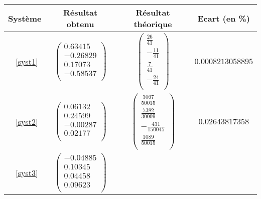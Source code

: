 \documentclass{report}
\begin{document}
        \begin{tabular}{|c|c|c|c|}
          \hline
          Système & Résultat obtenu & Résultat théorique & Ecart (en \%) \\ %
          \hline
          ~\eqref{syst1}
          &
          $\begin{pmatrix}
              0.63415 \\
              -0.26829 \\
              0.17073 \\
              -0.58537 \\
           \end{pmatrix}$
          &
          $\begin{pmatrix}
              \frac{26}{41} \\
              -\frac{11}{41} \\
              \frac{7}{41} \\
              -\frac{24}{41} \\
          \end{pmatrix}$
          &
          $0.0008213058895$\\
          \hline
          ~\eqref{syst2}
          &
          $\begin{pmatrix}
              0.06132 \\
              0.24599 \\
              -0.00287 \\
              0.02177 \\
           \end{pmatrix}$
          &
          $\begin{pmatrix}
              \frac{3067}{50015} \\
              \frac{7382}{30009} \\
              -\frac{431}{150045} \\
              \frac{1089}{50015} \\
          \end{pmatrix}$
          &
          $0.02643817358$ \\
          \hline
          ~\eqref{syst3}
          &
          $\begin{pmatrix}
              -0.04885 \\
              0.10345 \\
              0.04458 \\
              0.09623 \\
           \end{pmatrix}$

\end{tabular}
\end{document}
